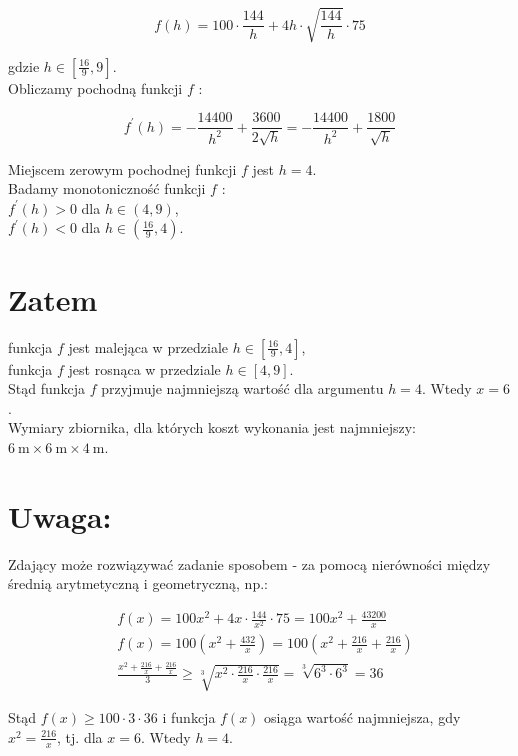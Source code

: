 \documentclass[10pt]{article}
\begin{document}
$$
f(h)=100 \cdot \frac{144}{h}+4 h \cdot \sqrt{\frac{144}{h}} \cdot 75
$$

gdzie $h \in\left[\frac{16}{9}, 9\right]$.\\
Obliczamy pochodną funkcji $f$ :

$$
f^{\prime}(h)=-\frac{14400}{h^{2}}+\frac{3600}{2 \sqrt{h}}=-\frac{14400}{h^{2}}+\frac{1800}{\sqrt{h}}
$$

Miejscem zerowym pochodnej funkcji $f$ jest $h=4$.\\
Badamy monotoniczność funkcji $f$ :\\
$f^{\prime}(h)>0$ dla $h \in(4,9)$,\\
$f^{\prime}(h)<0$ dla $h \in\left(\frac{16}{9}, 4\right)$.

\section*{Zatem}
funkcja $f$ jest malejąca w przedziale $h \in\left[\frac{16}{9}, 4\right]$,\\
funkcja $f$ jest rosnąca w przedziale $h \in[4,9]$.\\
Stąd funkcja $f$ przyjmuje najmniejszą wartość dla argumentu $h=4$. Wtedy $x=6$.\\
Wymiary zbiornika, dla których koszt wykonania jest najmniejszy: $6 \mathrm{~m} \times 6 \mathrm{~m} \times 4 \mathrm{~m}$.

\section*{Uwaga:}
Zdający może rozwiązywać zadanie sposobem - za pomocą nierówności między średnią arytmetyczną i geometryczną, np.:

$$
\begin{aligned}
& f(x)=100 x^{2}+4 x \cdot \frac{144}{x^{2}} \cdot 75=100 x^{2}+\frac{43200}{x} \\
& f(x)=100\left(x^{2}+\frac{432}{x}\right)=100\left(x^{2}+\frac{216}{x}+\frac{216}{x}\right) \\
& \frac{x^{2}+\frac{216}{x}+\frac{216}{x}}{3} \geq \sqrt[3]{x^{2} \cdot \frac{216}{x} \cdot \frac{216}{x}}=\sqrt[3]{6^{3} \cdot 6^{3}}=36
\end{aligned}
$$

Stąd $f(x) \geq 100 \cdot 3 \cdot 36$ i funkcja $f(x)$ osiąga wartość najmniejsza, gdy $x^{2}=\frac{216}{x}$, tj. dla $x=6$. Wtedy $h=4$.
\end{document}
